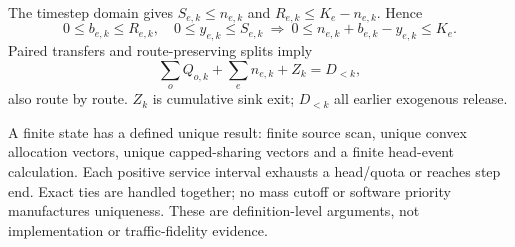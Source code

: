 \documentclass[10pt,a4paper]{article}
\begin{document}
The timestep domain gives $S_{e,k}\leq n_{e,k}$ and
$R_{e,k}\leq K_e-n_{e,k}$. Hence
\begin{equation}
 0\leq b_{e,k}\leq R_{e,k},\quad0\leq y_{e,k}\leq S_{e,k}
 \ \Longrightarrow\
 0\leq n_{e,k}+b_{e,k}-y_{e,k}\leq K_e .
 \label{eq:storage-bound}
\end{equation}
Paired transfers and route-preserving splits imply
\begin{equation}
 \sum_oQ_{o,k}+\sum_en_{e,k}+Z_k=D_{<k},
 \label{eq:mass-identity}
\end{equation}
also route by route. $Z_k$ is cumulative sink exit; $D_{<k}$ all earlier
exogenous release.

A finite state has a defined unique result: finite source scan, unique
convex allocation vectors, unique capped-sharing vectors and a finite
head-event calculation. Each positive service interval exhausts a
head/quota or reaches step end. Exact ties are handled together; no
mass cutoff or software priority manufactures uniqueness. These are
definition-level arguments, not implementation or traffic-fidelity evidence.
\end{document}
